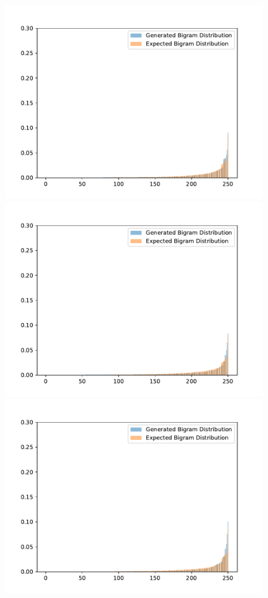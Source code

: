 \begin{figure}[H]
	\centering
	\small
	\endminipage\hfill
	\includegraphics[width=\linewidth]{img/plots/reddit/bigram_distribution_comparison_step_2000000.pdf}
	\centering
	\small
	\endminipage\hfill
	\includegraphics[width=\linewidth]{img/plots/reddit/bigram_distribution_comparison_step_2500000.pdf}
	\centering
	\small
	\endminipage\hfill
	\includegraphics[width=\linewidth]{img/plots/reddit/bigram_distribution_comparison_step_3000000.pdf}

\end{figure}
